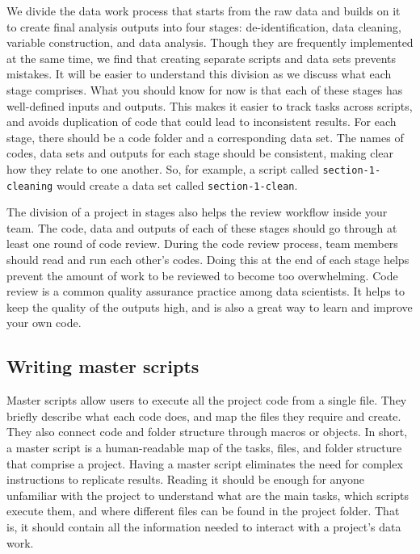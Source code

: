 We divide the data work process that starts from the raw data
and builds on it to create final analysis outputs into four stages:
de-identification, data cleaning, variable construction, and data analysis.
Though they are frequently implemented at the same time,
we find that creating separate scripts and data sets prevents mistakes.
It will be easier to understand this division as we discuss what each stage comprises.
What you should know for now is that each of these stages has well-defined inputs and outputs.
This makes it easier to track tasks across scripts,
and avoids duplication of code that could lead to inconsistent results.
For each stage, there should be a code folder and a corresponding data set.
The names of codes, data sets and outputs for each stage should be consistent,
making clear how they relate to one another.
So, for example, a script called \texttt{section-1-cleaning} would create
a data set called \texttt{section-1-clean}.

The division of a project in stages also helps the review workflow inside your team.
The code, data and outputs of each of these stages should go through at least one round of code review.
During the code review process, team members should read and run each other's codes.
Doing this at the end of each stage helps prevent the amount of work to be reviewed to become too overwhelming.
Code review is a common quality assurance practice among data scientists.
It helps to keep the quality of the outputs high, and is also a great way to learn and improve your own code.

\subsection{Writing master scripts}

Master scripts allow users to execute all the project code from a single file.
They briefly describe what each code does,
and map the files they require and create.
They also connect code and folder structure through macros or objects.
In short, a master script is a human-readable map of the tasks,
files, and folder structure that comprise a project.
Having a master script eliminates the need for complex instructions to replicate results.
Reading it should be enough for anyone unfamiliar with the project
to understand what are the main tasks, which scripts execute them,
and where different files can be found in the project folder.
That is, it should contain all the information needed to interact with a project's data work.

